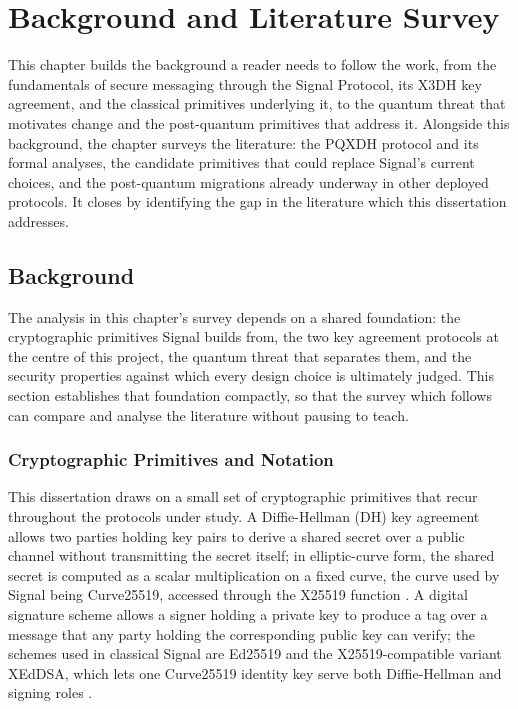 \section{Background and Literature Survey}
\label{sec:lit}

This chapter builds the background a reader needs to follow the work, from the fundamentals of secure messaging through the Signal Protocol, its X3DH key agreement, and the classical primitives underlying it, to the quantum threat that motivates change and the post-quantum primitives that address it. Alongside this background, the chapter surveys the literature: the PQXDH protocol and its formal analyses, the candidate primitives that could replace Signal's current choices, and the post-quantum migrations already underway in other deployed protocols. It closes by identifying the gap in the literature which this dissertation addresses.

\subsection{Background}
\label{subsec:background}

The analysis in this chapter's survey depends on a shared foundation: the cryptographic primitives Signal builds from, the two key agreement protocols at the centre of this project, the quantum threat that separates them, and the security properties against which every design choice is ultimately judged. This section establishes that foundation compactly, so that the survey which follows can compare and analyse the literature without pausing to teach.

\subsubsection{Cryptographic Primitives and Notation}
\label{subsubsec:primitives}

This dissertation draws on a small set of cryptographic primitives that recur throughout the protocols under study. A Diffie-Hellman (DH) key agreement allows two parties holding key pairs to derive a shared secret over a public channel without transmitting the secret itself; in elliptic-curve form, the shared secret is computed as a scalar multiplication on a fixed curve, the curve used by Signal being Curve25519, accessed through the X25519 function \cite{yung_curve25519_2006, langley_elliptic_2016}. A digital signature scheme allows a signer holding a private key to produce a tag over a message that any party holding the corresponding public key can verify; the schemes used in classical Signal are Ed25519 and the X25519-compatible variant XEdDSA, which lets one Curve25519 identity key serve both Diffie-Hellman and signing roles \cite{perrin_xeddsa_nodate}.

